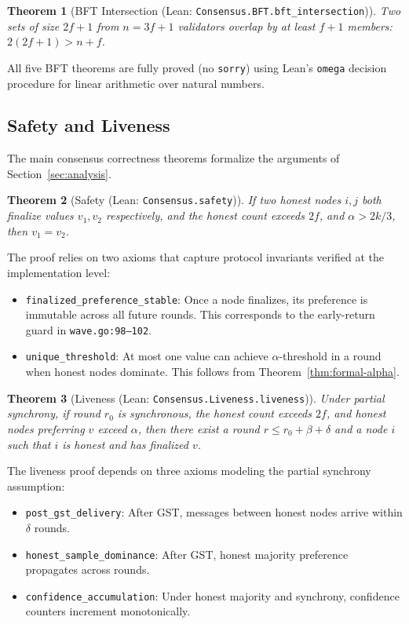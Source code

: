 \documentclass[11pt,a4paper]{article}
\newtheorem{theorem}{Theorem}[section]
\begin{document}
\begin{theorem}[BFT Intersection (Lean: \texttt{Consensus.BFT.bft\_intersection})]
Two sets of size $2f+1$ from $n = 3f+1$ validators overlap by at least $f+1$ members:
$2(2f+1) > n + f$.
\end{theorem}

All five BFT theorems are fully proved (no \texttt{sorry}) using Lean's \texttt{omega} decision
procedure for linear arithmetic over natural numbers.

\subsection{Safety and Liveness}

The main consensus correctness theorems formalize the arguments of Section~\ref{sec:analysis}.

\begin{theorem}[Safety (Lean: \texttt{Consensus.safety})]
\label{thm:formal-safety}
If two honest nodes $i, j$ both finalize values $v_1, v_2$ respectively, and the honest
count exceeds $2f$, and $\alpha > 2k/3$, then $v_1 = v_2$.
\end{theorem}

The proof relies on two axioms that capture protocol invariants verified at the
implementation level:
\begin{itemize}[nosep]
\item \texttt{finalized\_preference\_stable}: Once a node finalizes, its preference is
immutable across all future rounds. This corresponds to the early-return guard in
\texttt{wave.go:98--102}.
\item \texttt{unique\_threshold}: At most one value can achieve $\alpha$-threshold in a
round when honest nodes dominate. This follows from Theorem~\ref{thm:formal-alpha}.
\end{itemize}

\begin{theorem}[Liveness (Lean: \texttt{Consensus.Liveness.liveness})]
\label{thm:formal-liveness}
Under partial synchrony, if round $r_0$ is synchronous, the honest count exceeds $2f$,
and honest nodes preferring $v$ exceed $\alpha$, then there exist a round
$r \leq r_0 + \beta + \delta$ and a node $i$ such that $i$ is honest and has finalized $v$.
\end{theorem}

The liveness proof depends on three axioms modeling the partial synchrony assumption:
\begin{itemize}[nosep]
\item \texttt{post\_gst\_delivery}: After GST, messages between honest nodes arrive within
$\delta$ rounds.
\item \texttt{honest\_sample\_dominance}: After GST, honest majority preference propagates
across rounds.
\item \texttt{confidence\_accumulation}: Under honest majority and synchrony, confidence
counters increment monotonically.
\end{itemize}
\end{document}
